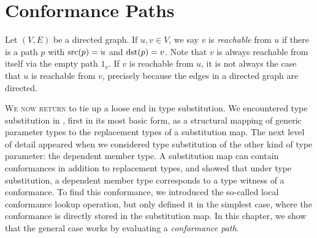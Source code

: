 \documentclass[../generics]{subfiles}
\begin{document}
\newcommand{\NormalConformance}[4]{
\begin{tabular}{|lcl|}
\hline
\multicolumn{3}{|l|}{\texttt{#1:\ #2}}\\
\hline
\rule{0pt}{3ex}\textbf{Associated type}&&\textbf{Type witness}\\
#3\\[\medskipamount]
\textbf{Conformance requirement}&&\textbf{Conformance}\\
#4\\[\medskipamount]
\hline
\end{tabular}
}
\newcommand{\AssocTypeDef}[2]{$\AssocType{#1}$&$\mapsto$&\texttt{#2}}
\newcommand{\AssocConfDef}[3]{$\AssocConf{#1}{#3}$&$\mapsto$&\ConfReq{#2}{#3}}

\chapter{Conformance Paths}\label{conformance paths}

\ifWIP

\begin{definition}
Let $(V, E)$ be a directed graph. If $u,v\in V$, we say $v$ is \emph{reachable} from $u$ if there is a path $p$ with $\operatorname{src}(p)=u$ and $\operatorname{dst}(p)=v$. Note that $v$ is always reachable from itself via the empty path $1_v$. If $v$ is reachable from $u$, it is not always the case that $u$ is reachable from $v$, precisely because the edges in a directed graph are directed.
\end{definition}

\fi

\lettrine{W}{e now return} to tie up a loose end in type substitution. We encountered type substitution in , first in its most basic form, as a structural mapping of generic parameter types to the replacement types of a substitution map. The next level of detail appeared when we considered type substitution of the other kind of type parameter: the dependent member type. A substitution map can contain conformances in addition to replacement types, and  showed that under type substitution, a dependent member type corresponds to a type witness of a conformance. To find this conformance, we introduced the so-called local conformance lookup operation, but only defined it in the simplest case, where the conformance is directly stored in the substitution map. In this chapter, we show that the general case works by evaluating a \emph{conformance path}.
\end{document}
